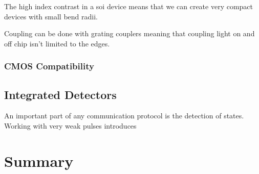 The high index contrast in a \ac{soi} device means that we can create very compact devices with small bend radii.

Coupling can be done with grating couplers meaning that coupling light on and off chip isn't limited to the edges.

\subsubsection*{CMOS Compatibility}

\subsection{Integrated Detectors}

An important part of any communication protocol is the detection of states. Working with very weak pulses introduces 

\section{Summary}


